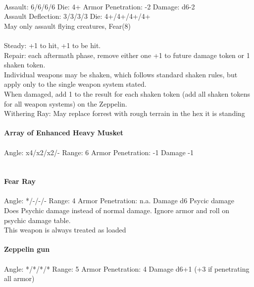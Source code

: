 \ \\
Assault: 6/6/6/6 Die: 4+ Armor Penetration: -2 Damage: d6-2 \\
Assault Deflection: 3/3/3/3 Die: 4+/4+/4+/4+\\
\indent May only assault flying creatures, Fear(8) \\
\ \\
Steady: +1 to hit, +1 to be hit. \\ Repair: each aftermath phase, remove either one +1 to future damage token or 1 shaken token. \\ Individual weapons may be shaken, which follows standard shaken rules, but apply only to the single weapon system stated. \\ When damaged, add 1 to the result for each shaken token (add all shaken tokens for all weapon systems) on the Zeppelin. \\ Withering Ray: May replace forrest with rough terrain in the hex it is standing
\ \\
\ \\
{\bf Array of Enhanced Heavy Musket } \\
\ \\
Angle: x4/x2/x2/- Range: 6 Armor Penetration: -1 Damage -1 \\
\indent  \\



\ \\
{\bf Fear Ray } \\
\ \\
Angle: */-/-/- Range: 4 Armor Penetration: n.a. Damage d6 Psycic damage \\
\indent Does Psychic damage instead of normal damage. Ignore armor and roll on psychic damage table. \\ This weapon is always treated as loaded \\



\ \\
{\bf Zeppelin gun } \\
\ \\
Angle: */*/*/* Range: 5 Armor Penetration: 4 Damage d6+1 (+3 if penetrating all armor) \\
\indent  \\





